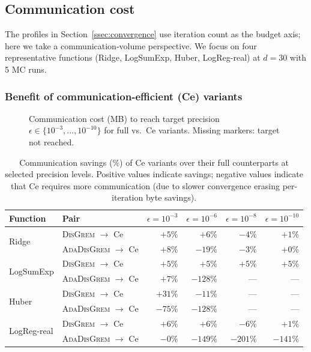 \documentclass[review,onefignum,onetabnum]{siamart171218}
\begin{document}
	\FloatBarrier
	\subsection{Communication cost}\label{ssec:commexp}
	
	The profiles in Section~\ref{ssec:convergence} use iteration count
	as the budget axis; here we take a communication-volume perspective.
	We focus on four representative functions (Ridge, LogSumExp, Huber,
	LogReg-real) at $d=30$ with 5 MC runs.
	
	\subsubsection{Benefit of communication-efficient (Ce) variants}
	
	\begin{figure}[htbp]
		\centering
		\caption{Communication cost (MB) to reach target precision
			$\epsilon\in\{10^{-3},\ldots,10^{-10}\}$ for full vs.\ Ce variants.
			Missing markers: target not reached.}
		\label{fig:ce_benefit}
	\end{figure}
	
	\begin{table}[htbp]
		\centering
		\caption{Communication savings (\%) of Ce variants over their full
			counterparts at selected precision levels.
			Positive values indicate savings; negative values indicate that
			Ce requires more communication (due to slower convergence
			erasing per-iteration byte savings).}
		\label{tab:ce_savings}
		\setlength{\tabcolsep}{5pt}
		\small
		\begin{tabular}{llrrrr}
			\toprule
			Function & Pair & $\epsilon{=}10^{-3}$ & $\epsilon{=}10^{-6}$ & $\epsilon{=}10^{-8}$ & $\epsilon{=}10^{-10}$ \\
			\midrule
			\multirow{2}{*}{Ridge}
		& \textsc{DisGrem} $\to$ Ce       & $+5\%$  & $+6\%$   & $-4\%$  & $+1\%$  \\
		& \textsc{AdaDisGrem} $\to$ Ce    & $+8\%$  & $-19\%$  & $-3\%$  & $+0\%$  \\
		\midrule
		\multirow{2}{*}{LogSumExp}
		& \textsc{DisGrem} $\to$ Ce       & $+5\%$  & $+5\%$   & $+5\%$  & $+5\%$  \\
		& \textsc{AdaDisGrem} $\to$ Ce    & $+7\%$  & $-128\%$ & ---     & ---     \\
		\midrule
		\multirow{2}{*}{Huber}
		& \textsc{DisGrem} $\to$ Ce       & $+31\%$ & $-11\%$  & ---     & ---     \\
		& \textsc{AdaDisGrem} $\to$ Ce    & $-75\%$ & $-128\%$ & ---     & ---     \\
		\midrule
		\multirow{2}{*}{LogReg-real}
		& \textsc{DisGrem} $\to$ Ce       & $+6\%$  & $+6\%$   & $-6\%$  & $+1\%$  \\
		& \textsc{AdaDisGrem} $\to$ Ce    & $-0\%$  & $-149\%$ & $-201\%$ & $-141\%$ \\
			\bottomrule
		\end{tabular}
	\end{table}
	
\end{document}
